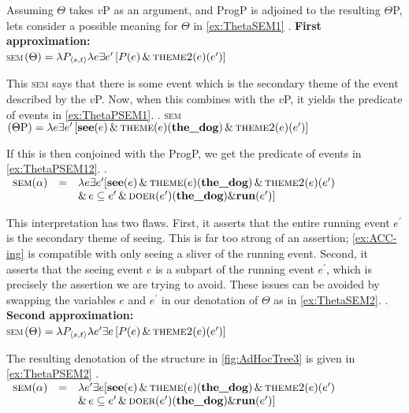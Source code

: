 \documentclass[MilwayThesis]{subfiles}
\begin{document}
Assuming $\Theta$ takes $v$P as an argument, and ProgP is adjoined to the resulting $\Theta$P, lets consider a possible meaning for $\Theta$ in \cref{ex:ThetaSEM1}
\ex. \textbf{First approximation:}\\ \textsc{sem}$(\Theta) = \lambda P_{\langle s,t\rangle} \lambda e \exists e^{\prime}\left[ P(e)\,\&\,\textsc{theme2}(e)(e^{\prime}) \right]$\label{ex:ThetaSEM1}

This \textsc{sem} says that there is some event which is the secondary theme of the event described by the $v$P.
Now, when this combines with the $v$P, it yields the predicate of events in \cref{ex:ThetaPSEM1}.
\ex.\label{ex:ThetaPSEM1} \textsc{sem}$(\Theta\text{P}) = \lambda e \exists e^{\prime}\left[ \textbf{see}(e)\,\&\,\textsc{theme}(e)(\textbf{the\_dog})\,\&\,\textsc{theme2}(e)(e^{\prime})\right]$

If this is then conjoined with the ProgP, we get the predicate of events in \cref{ex:ThetaPSEM12}.
\ex.\label{ex:ThetaPSEM12} 
$
\begin{array}[t]{rcl}
	\textsc{sem}(\alpha) & = & \lambda e \exists e^{\prime}[ \textbf{see}(e)\,\&\,\textsc{theme}(e)(\textbf{the\_dog})\,\&\,\textsc{theme2}(e)(e^{\prime})\\
		& & \&\,e\subseteq e^{\prime} \,\&\, \textsc{doer}(e^{\prime})(\textbf{the\_dog}) \& \textbf{run}(e^{\prime})]
\end{array}
$

This interpretation has two flaws.
First, it asserts that the entire running event $e^{\prime}$ is the secondary theme of seeing.
This is far too strong of an assertion; \cref{ex:ACC-ing} is compatible with only seeing a sliver of the running event.
Second, it asserts that the seeing event $e$ is a subpart of the running event $e^{\prime}$, which is precisely the assertion we are trying to avoid.
These issues can be avoided by swapping the variables $e$ and $e^{\prime}$ in our denotation of $\Theta$ as in \cref{ex:ThetaSEM2}.
\ex. \textbf{Second approximation:}\\ \textsc{sem}$(\Theta) = \lambda P_{\langle s,t\rangle} \lambda e^{\prime} \exists e\left[ P(e)\,\&\,\textsc{theme2}(e)(e^{\prime}) \right]$\label{ex:ThetaSEM2}

The resulting denotation of the structure in \cref{fig:AdHocTree3} is given in \cref{ex:ThetaPSEM2}
\ex.\label{ex:ThetaPSEM2} 
$
\begin{array}[t]{rcl}
	\textsc{sem}(\alpha) & = & \lambda e^{\prime} \exists e [ \textbf{see}(e)\,\&\,\textsc{theme}(e)(\textbf{the\_dog})\,\&\,\textsc{theme2}(e)(e^{\prime})\\
		& & \&\,e\subseteq e^{\prime} \,\&\, \textsc{doer}(e^{\prime})(\textbf{the\_dog}) \& \textbf{run}(e^{\prime})]
\end{array}
$
\end{document}
